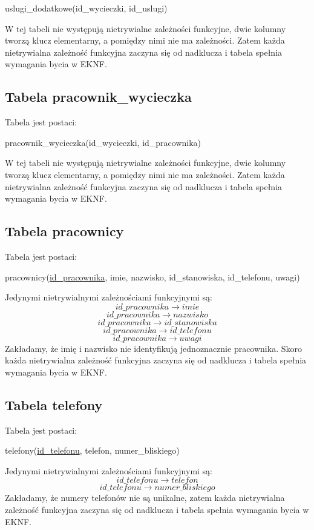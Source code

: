 \documentclass[a4paper,12pt]{mwart}
\begin{document}
uslugi\_dodatkowe(id\_wycieczki, id\_uslugi)

W tej tabeli nie występują nietrywialne zależności funkcyjne, dwie kolumny  tworzą klucz elementarny, a pomiędzy nimi nie ma zależności.
Zatem każda nietrywialna zależność funkcyjna zaczyna się od nadklucza i tabela  spełnia wymagania bycia w EKNF.

\subsection{Tabela pracownik\_wycieczka}
Tabela jest postaci:

pracownik\_wycieczka(id\_wycieczki, id\_pracownika)

W tej tabeli nie występują nietrywialne zależności funkcyjne, dwie kolumny  tworzą klucz elementarny, a pomiędzy nimi nie ma zależności.
Zatem każda nietrywialna zależność funkcyjna zaczyna się od nadklucza i tabela  spełnia wymagania bycia w EKNF.

\subsection{Tabela pracownicy}
Tabela jest postaci:

pracownicy(\underline{id\_pracownika}, imie, nazwisko, id\_stanowiska, id\_telefonu, uwagi)

\noindent Jedynymi nietrywialnymi zależnościami funkcyjnymi są:
$$   id\_pracownika\rightarrow imie $$
$$   id\_pracownika\rightarrow nazwisko $$
$$   id\_pracownika\rightarrow id\_stanowiska $$
$$   id\_pracownika\rightarrow id\_telefonu $$
$$   id\_pracownika\rightarrow uwagi $$
Zakładamy, że imię i nazwisko nie identyfikują jednoznacznie pracownika.
Skoro każda nietrywialna zależność funkcyjna zaczyna się od nadklucza i tabela  spełnia wymagania bycia w EKNF.


\subsection{Tabela telefony}
Tabela jest postaci:

telefony(\underline{id\_telefonu}, telefon, numer\_bliskiego)

\noindent Jedynymi nietrywialnymi zależnościami funkcyjnymi są:
$$   id\_telefonu \rightarrow telefon $$
$$   id\_telefonu \rightarrow numer\_bliskiego $$
Zakładamy, że numery telefonów nie są unikalne,
zatem każda nietrywialna zależność funkcyjna zaczyna się od nadklucza i tabela  spełnia wymagania bycia w EKNF.
\end{document}
